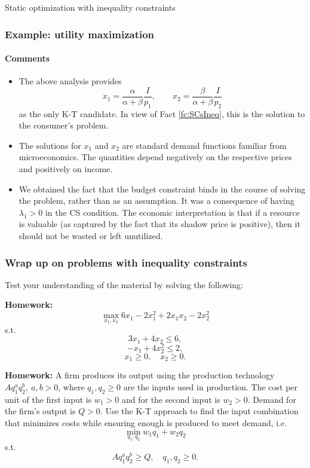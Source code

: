 \documentclass[10pt]{beamer}
\theoremstyle{definition}
\begin{document}
\begin{section}{Static optimization with inequality constraints}
\begin{frame}[fragile]
\frametitle{Example: utility maximization}
\framesubtitle{Comments}
\begin{itemize}
\item The above analysis provides \[ x_1 = \dfrac{\alpha}{\alpha+\beta}\dfrac{I}{p_1}, \qquad x_2 = \dfrac{\beta}{\alpha+\beta}\dfrac{I}{p_2} \] as the only K-T candidate. In view of Fact \ref{fc:SCsIneq}, this is the solution to the consumer's problem.
\item The solutions for $ x_1 $ and $ x_2 $ are standard demand functions familiar from microeconomics. The quantities depend negatively on the respective prices and positively on income.
\item We obtained the fact that the budget constraint binds in the course of solving the problem, rather than as an assumption. It was a consequence of having $ \lambda_1 > 0$ in the CS condition. The economic interpretation is that if a resource is valuable (as captured by the fact that its shadow price is positive), then it should not be wasted or left unutilized.
\end{itemize}
\end{frame}

\begin{frame}[fragile]
\frametitle{Wrap up on problems with inequality constraints}
Test your understanding of the material by solving the following:

\textbf{Homework:} \[ \max_{x_1,x_2} 6x_1-2 x_1^2 + 2 x_1 x_2-2x_2^2  \]
s.t. 
\[ 3x_1+4x_2 \leq 6, \] 
\[ -x_1 + 4x_2^2 \leq 2, \]
\[  x_1\geq 0,\quad x_2\geq 0. \]

\textbf{Homework:} A firm produces its output using the production technology $ A q_1^a q_2^b,~a,b>0 $, where $ q_1,q_2 \geq 0 $ are the inputs used in production. The cost per unit of the first input is $ w_1 >0 $ and for the second input is $ w_2 >0$. Demand for the firm's output is $ Q>0 $. Use the K-T approach to find the input combination that minimizes costs while ensuring enough is produced to meet demand, i.e. \[ \min_{q_1,q_2} w_1 q_1 + w_2 q_2\]
s.t. \[ A q_1^a q_2^b \geq Q,\quad q_1,q_2 \geq 0. \]
\end{frame}

\end{section}
\end{document}

